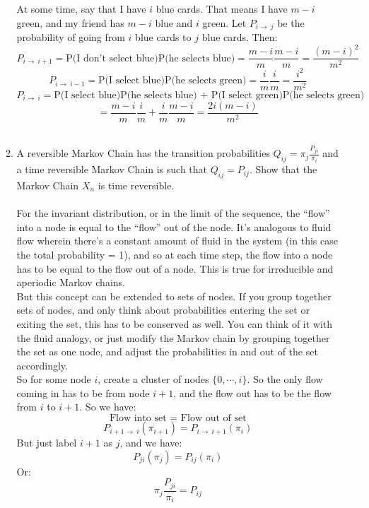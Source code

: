 \begin{enumerate}
\begin{enumerate}
        At some time, say that I have $i$ blue cards. That means I have $m-i$ green, and my friend has $m-i$ blue and $i$ green. Let $P_{i \to\ j}$ be the probability of going from $i$ blue cards to $j$ blue cards. Then:
        $$P_{i \to\ i+1} = \text{P(I don't select blue)P(he selects blue)} = \frac{m-i}{m} \frac{m-i}{m} = \frac{(m-i)^2}{m^2}$$
        $$P_{i \to\ i-1} = \text{P(I select blue)P(he selects green)} = \frac{i}{m} \frac{i}{m} = \frac{i^2}{m^2}$$
        $$P_{i \to\ i} = \text{P(I select blue)P(he selects blue) + P(I select green)P(he selects green)}$$
        $$=\frac{m-i}{m} \frac{i}{m} + \frac{i}{m} \frac{m-i}{m} = \frac{2i(m-i)}{m^2}$$\\

      \item A reversible Markov Chain has the transition probabilities $Q_{ij} = \pi_j \frac{P_{ji}}{\pi_i}$ and a time reversible Markov Chain is such that $Q_{ij} = P_{ij}$. Show that the Markov Chain $X_n$ is time reversible.\\\\

        For the invariant distribution, or in the limit of the sequence, the ``flow'' into a node is equal to the ``flow'' out of the node. It's analogous to fluid flow wherein there's a constant amount of fluid in the system (in this case the total probability = 1), and so at each time step, the flow into a node has to be equal to the flow out of a node. This is true for irreducible and aperiodic Markov chains.\\

        But this concept can be extended to sets of nodes. If you group together sets of nodes, and only think about probabilities entering the set or exiting the set, this has to be conserved as well. You can think of it with the fluid analogy, or just modify the Markov chain by grouping together the set as one node, and adjust the probabilities in and out of the set accordingly.\\

        So for some node $i$, create a cluster of nodes $\{0, \cdots, i\}$. So the only flow coming in has to be from node $i+1$, and the flow out has to be the flow from $i$ to $i+1$. So we have:
        $$\text{Flow into set = Flow out of set}$$
        $$P_{i+1 \to\ i} (\pi_{i+1}) = P_{i \to\ i+1} (\pi_{i})$$
        But just label $i+1$ as $j$, and we have:
        $$P_{ji} (\pi_{j}) = P_{ij} (\pi_{i})$$
        Or:
        $$\pi_j \frac{P_{ji}}{\pi_{i}} = P_{ij}$$
        

\end{enumerate}
\end{enumerate}
